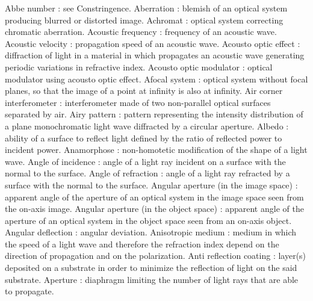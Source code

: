 Abbe number                                          : see Constringence.
Aberration                                           : blemish of an optical system producing blurred or distorted image.
Achromat                                             : optical system correcting chromatic aberration.
Acoustic frequency                                   : frequency of an acoustic wave.
Acoustic velocity                                    : propagation speed of an acoustic wave.
Acousto optic effect                                 : diffraction of light in a material in which propagates an acoustic wave generating periodic variations in refractive index.
Acousto optic modulator                              : optical modulator using acousto optic effect.
Afocal system                                        : optical system without focal planes, so that the image of a point at infinity is also at infinity.
Air corner interferometer                            : interferometer made of two non-parallel optical surfaces separated by air.
Airy pattern                                         : pattern representing the intensity distribution of a plane monochromatic light wave diffracted by a circular aperture.
Albedo                                               : ability of a surface to reflect light defined by the ratio of reflected power to incident power.
Anamorphose                                          : non-homotetic modification of the shape of a light wave.
Angle of incidence                                   : angle of a light ray incident on a surface with the normal to the surface.
Angle of refraction                                  : angle of a light ray refracted by a surface with the normal to the surface.
Angular aperture (in the image space)                : apparent angle of the aperture of an optical system in the image space seen from the on-axis image.
Angular aperture (in the object space)               : apparent angle of the aperture of an optical system in the object space seen from an on-axis object.
Angular deflection                                   : angular deviation.
Anisotropic medium                                   : medium in which the speed of a light wave and therefore the refraction index depend on the direction of propagation and on the polarization.
Anti reflection coating                              : layer(s) deposited on a substrate in order to minimize the reflection of light on the said substrate.
Aperture                                             : diaphragm limiting the number of light rays that are able to propagate.
